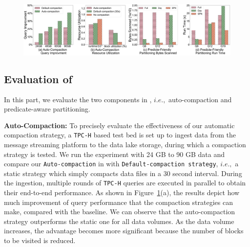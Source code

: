 \begin{figure}
	\centering
	\includegraphics[width=\textwidth]{figures/LakeBrain}
	\caption{}
	\label{fig:lakebrain}
\end{figure}



\subsection{Evaluation of \brain}

In this part, we evaluate the two components in \brain, $i.e.,$ auto-compaction and predicate-aware partitioning.

 
\noindent \textbf{Auto-Compaction:} To precisely evaluate the effectiveness of our automatic compaction strategy, a \texttt{TPC-H} based test bed is set up to ingest data from the message streaming platform to the data lake storage, during which a compaction strategy is tested.
 We run the experiment with 24 GB to 90 GB data and compare our \texttt{Auto-compaction} in \sys with \texttt{Default-compaction strategy}, $i.e.,$ a static strategy which simply compacts data files in a 30 second interval. 
During the ingestion, multiple rounds of \texttt{TPC-H} queries are executed in parallel  to obtain their end-to-end performance. As shown in Figure~\ref{fig:lakebrain}(a), the results depict how much improvement of  query performance that the compaction strategies can make, compared with the baseline.
 We can observe that the auto-compaction strategy outperforms the static one for all data volumes. As the data volume increases, the advantage becomes more significant because the number of blocks to be visited is reduced.




